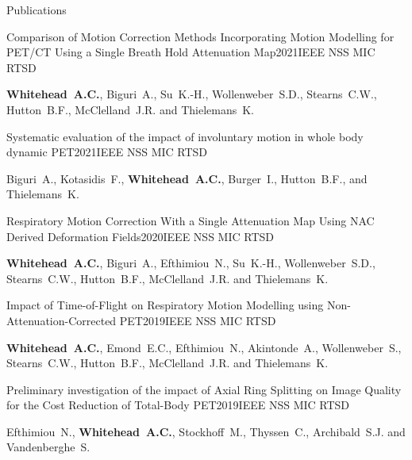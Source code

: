 \documentclass{cv}
\begin{document}
\begin{rSection}{Publications}
        \item \begin{rSubsection}{Comparison of Motion Correction Methods Incorporating Motion Modelling for PET/CT Using a Single Breath Hold Attenuation Map}{2021}{IEEE NSS MIC RTSD}{}
            \item {\bf Whitehead~A.C.}, Biguri~A., Su~K.-H., Wollenweber~S.D., Stearns~C.W., Hutton~B.F., McClelland~J.R. and Thielemans~K.
        \end{rSubsection}
        
        \item \begin{rSubsection}{Systematic evaluation of the impact of involuntary motion in whole body dynamic PET}{2021}{IEEE NSS MIC RTSD}{}
            \item Biguri~A., Kotasidis~F., {\bf Whitehead~A.C.}, Burger~I., Hutton~B.F., and Thielemans~K.
        \end{rSubsection}
        
        \item \begin{rSubsection}{Respiratory Motion Correction With a Single Attenuation Map Using NAC Derived Deformation Fields}{2020}{IEEE NSS MIC RTSD}{}
            \item {\bf Whitehead~A.C.}, Biguri~A., Efthimiou~N., Su~K.-H., Wollenweber~S.D., Stearns~C.W., Hutton~B.F., McClelland~J.R. and Thielemans~K.
        \end{rSubsection}
        
        \item \begin{rSubsection}{Impact of Time-of-Flight on Respiratory Motion Modelling using Non-Attenuation-Corrected \newline PET}{2019}{IEEE NSS MIC RTSD}{}
            \item {\bf Whitehead~A.C.}, Emond~E.C., Efthimiou~N., Akintonde~A., Wollenweber~S., Stearns~C.W., Hutton~B.F., McClelland~J.R. and Thielemans~K.
        \end{rSubsection}
        
        \item \begin{rSubsection}{Preliminary investigation of the impact of Axial Ring Splitting on Image Quality for the Cost Reduction of Total-Body PET}{2019}{IEEE NSS MIC RTSD}{}
            \item Efthimiou~N., {\bf Whitehead~A.C.}, Stockhoff~M., Thyssen~C., Archibald~S.J. and Vandenberghe~S.
        \end{rSubsection}
    \end{rSection}
    
\end{document}

